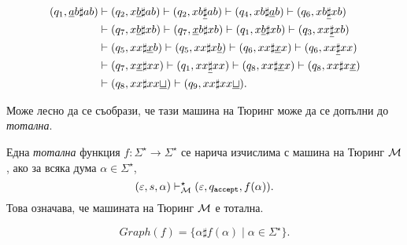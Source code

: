 \begin{example}
  \begin{align*}
    (q_1, \underline{a}b\sharp ab) & \vdash (q_2, x\underline{b}\sharp ab) \vdash (q_2,xb\underline{\sharp}ab) \vdash (q_4, xb\sharp\underline{a}b) \vdash (q_6, xb\underline{\sharp}xb)\\
    & \vdash (q_7, x\underline{b}\sharp xb) \vdash (q_7, \underline{x}b\sharp xb) \vdash (q_1, x\underline{b}\sharp xb) \vdash (q_3, xx\underline{\sharp}xb)\\
    & \vdash (q_5, xx\sharp\underline{x}b) \vdash (q_5, xx\sharp x\underline{b}) \vdash (q_6, xx\sharp\underline{x}x) \vdash (q_6, xx\underline{\sharp} xx)\\
    & \vdash (q_7, x\underline{x}\sharp xx) \vdash (q_1, xx\underline{\sharp} xx) \vdash (q_8, xx\sharp\underline{x}x) \vdash (q_8, xx\sharp x\underline{x})\\
    & \vdash (q_8, xx\sharp xx\underline{\sqcup}) \vdash (q_9,xx\sharp xx\underline{\sqcup}).
  \end{align*}

  Може лесно да се съобрази, че тази машина на Тюринг може да се допълни до {\em тотална}.
  
\end{example}


Една {\em тотална} функция $f:\Sigma^\star \to \Sigma^\star$ се нарича изчислима с машина на Тюринг $\mathcal{M}$, ако 
за всяка дума $\alpha \in \Sigma^\star$,
\[(\varepsilon, s, \alpha) \vdash^\star_{\mathcal{M}} (\varepsilon, q_{\texttt{accept}}, f(\alpha)).\]
Това означава, че машината на Тюринг $\mathcal{M}$ е тотална.

\[Graph(f) = \{\alpha\sharp f(\alpha) \mid \alpha \in \Sigma^\star\}.\]

